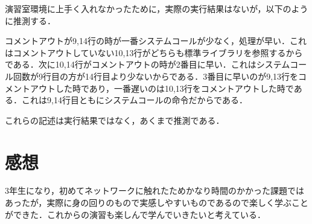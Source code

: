 \documentclass[a4j]{jarticle}
\begin{document}
演習室環境に上手く入れなかったために，実際の実行結果はないが，以下のように推測する．

コメントアウトが9,14行の時が一番システムコールが少なく，処理が早い．これはコメントアウトしていない10,13行がどちらも標準ライブラリを参照するからである．次に10,14行がコメントアウトの時が2番目に早い．これはシステムコール回数が9行目の方が14行目より少ないからである．3番目に早いのが9,13行をコメントアウトした時であり，一番遅いのは10,13行をコメントアウトした時である．これは9,14行目ともにシステムコールの命令だからである．

これらの記述は実行結果ではなく，あくまで推測である．

\section{感想}

3年生になり，初めてネットワークに触れたためかなり時間のかかった課題ではあったが，実際に身の回りのもので実感しやすいものであるので楽しく学ぶことができた．これからの演習も楽しんで学んでいきたいと考えている．
\end{document}
